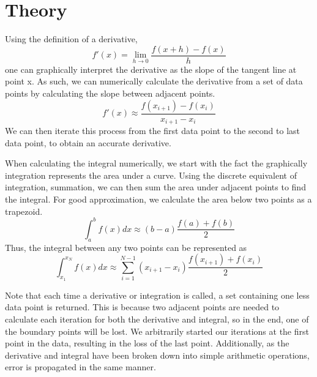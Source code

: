 \documentclass{article}
\begin{document}
\section{Theory}
Using the definition of a derivative,
\begin{equation} f'(x) = \lim_{h \to 0} \frac{f(x+h)-f(x)}{h} \end{equation}
one can graphically interpret the derivative as the slope of the tangent line at point x. As such, we can numerically calculate the derivative from a set of data points by calculating the slope between adjacent points.
\begin{equation} f'(x) \approx \frac{f(x_{i+1})-f(x_i)}{x_{i+1}-x_{i}}  \end{equation}
We can then iterate this process from the first data point to the second to last data point, to obtain an accurate derivative.

When calculating the integral numerically, we start with the fact the graphically integration represents the area under a curve. Using the discrete equivalent of integration, summation, we can then sum the area under adjacent points to find the integral. For good approximation, we calculate the area below two points as a trapezoid.
\begin{equation} \int^b_a f(x)dx \approx (b-a) \frac{f(a)+f(b)}{2}  \end{equation}
Thus, the integral between any two points can be represented as
\begin{equation} \int_{x_1}^{x_N} f(x)dx \approx \sum_{i=1}^{N-1} (x_{i+1}-x_i) \frac{f(x_{i+1})+f(x_i)}{2}  \end{equation}

Note that each time a derivative or integration is called, a set containing one less data point is returned. This is because two adjacent points are needed to calculate each iteration for both the derivative and integral, so in the end, one of the boundary points will be lost. We arbitrarily started our iterations at the first point in the data, resulting in the loss of the last point. Additionally, as the derivative and integral have been broken down into simple arithmetic operations, error is propagated in the same manner.
\end{document}
